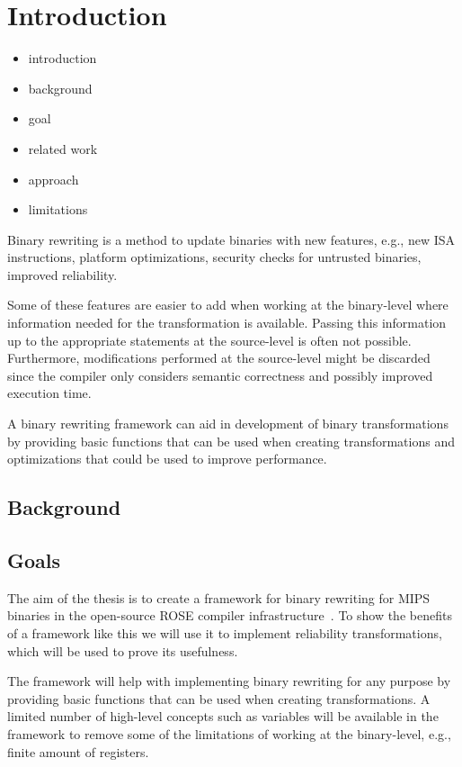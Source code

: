 \chapter{Introduction}

\begin{itemize}
    \item introduction
    \item background
    \item goal
    \item related work
    \item approach
    \item limitations
\end{itemize}


Binary rewriting is a method to update binaries with new
features, e.g., new ISA instructions, platform optimizations,
security checks for untrusted binaries, improved reliability.
%

Some of these features are easier to add when working at the binary-level
where information needed for the transformation is available.
Passing this information up to the appropriate statements at the
source-level is often not possible.
%
Furthermore, modifications performed at the source-level might be discarded
since the compiler only considers semantic correctness and
possibly improved execution time.
%

A binary rewriting framework can aid in development of binary
transformations by providing basic functions that can be
used when creating transformations and optimizations that could
be used to improve performance.
%

\section{Background}


\section{Goals}
The aim of the thesis is to create a framework for binary rewriting for MIPS
binaries in the open-source ROSE compiler infrastructure~\cite{rose}.
To show the benefits of a framework like this we will use it to implement
reliability transformations, which will be used to prove its usefulness.
%

The framework will help with implementing binary rewriting for
any purpose by providing basic functions that can be used when creating
transformations. A limited number of high-level concepts such as variables
will be available in the framework to remove some of the limitations of working
at the binary-level, e.g., finite amount of registers.
%

